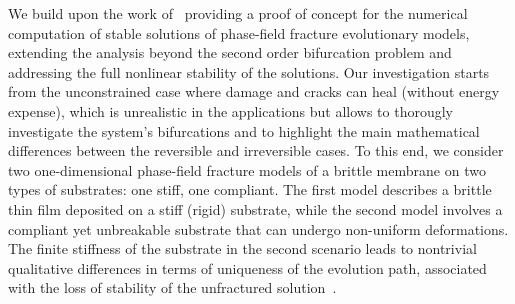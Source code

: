     {We build upon the work of~\cite{Baldelli2021-gc}
        providing a proof of concept for the numerical computation of stable solutions of phase-field fracture evolutionary models, extending the analysis beyond the second order bifurcation problem and addressing the full nonlinear stability of the solutions.
        Our investigation starts from the unconstrained case where damage and cracks can heal (without energy expense), which is unrealistic in the applications but allows to thorougly investigate the system's bifurcations and to highlight the main mathematical differences between the reversible and irreversible cases.
    }
To this end,
we consider two one-dimensional phase-field fracture models of a brittle membrane on two types of substrates: one stiff, one compliant. The first model describes a brittle thin film deposited on a stiff (rigid) substrate, while the second model involves a compliant yet unbreakable substrate that can undergo non-uniform deformations. The finite stiffness of the substrate in the second scenario leads to nontrivial qualitative differences in terms of uniqueness of the evolution path, associated with  the loss of stability of the unfractured solution~\cite{Baldelli2014-ho,Kuhn2015-rt,Baldelli2021-gc,Harandi2023-cd,zolesi:2024}.


